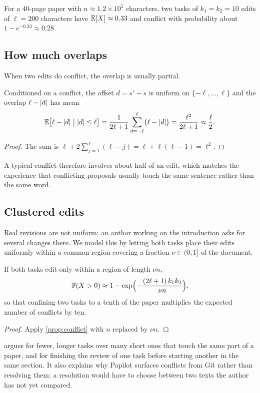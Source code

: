 For a $40$-page paper with $n \approx 1.2 \times 10^{5}$ characters, two tasks
of $k_1 = k_2 = 10$ edits of $\ell = 200$ characters have $\mathbb{E}[X] \approx 0.33$
and conflict with probability about $1 - e^{-0.33} \approx 0.28$.

\subsection{How much overlaps}

When two edits do conflict, the overlap is usually partial.

\begin{proposition}
\label{prop:overlap}
Conditioned on a conflict, the offset $d = s' - s$ is uniform on
$\{-\ell, \dots, \ell\}$ and the overlap $\ell - \lvert d\rvert$ has mean
\begin{equation}
  \mathbb{E}\bigl[\ell - \lvert d\rvert \bigm| \lvert d\rvert \le \ell\bigr]
  = \frac{1}{2\ell + 1} \sum_{d=-\ell}^{\ell} \bigl(\ell - \lvert d\rvert\bigr)
  = \frac{\ell^{2}}{2\ell + 1}
  \approx \frac{\ell}{2} .
  \label{eq:overlap}
\end{equation}
\end{proposition}

\begin{proof}
The sum is $\ell + 2\sum_{j=1}^{\ell} (\ell - j) = \ell + \ell(\ell - 1) = \ell^2$.
\end{proof}

A typical conflict therefore involves about half of an edit, which matches the
experience that conflicting proposals usually touch the same sentence rather
than the same word.

\subsection{Clustered edits}

Real revisions are not uniform: an author working on the introduction asks for
several changes there. We model this by letting both tasks place their edits
uniformly within a common region covering a fraction $\nu \in (0, 1]$ of the
document.

\begin{corollary}
\label{cor:clustered}
If both tasks edit only within a region of length $\nu n$,
\begin{equation}
  \mathbb{P}(X > 0) \approx 1 - \exp\Bigl(-\frac{(2\ell+1)\, k_1 k_2}{\nu n}\Bigr),
  \label{eq:clustered}
\end{equation}
so that confining two tasks to a tenth of the paper multiplies the expected
number of conflicts by ten.
\end{corollary}

\begin{proof}
Apply \cref{prop:conflict} with $n$ replaced by $\nu n$.
\end{proof}

 argues for fewer, longer tasks over many short ones that
touch the same part of a paper, and for finishing the review of one task
before starting another in the same section. It also explains why Papilot
surfaces conflicts from Git rather than resolving them: a resolution would
have to choose between two texts the author has not yet compared.
